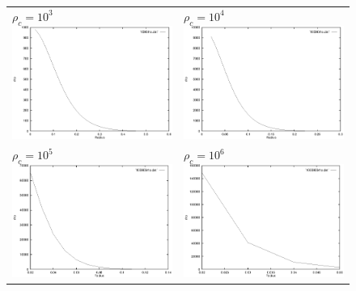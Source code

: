 \documentclass[a4paper]{IEEEtran}
\begin{document}
\begin{figure}
\begin{center}
\begin{tabular}{p{7cm}p{7cm}}
        \\
        $\rho_c = 10^3$ \newline \includegraphics[width=7cm]{figures/1000rho.eps}  & 
        $\rho_c = 10^4$ \newline \includegraphics[width=7cm]{figures/10000rho.eps}   
        \\
        $\rho_c = 10^5$ \newline \includegraphics[width=7cm]{figures/100000rho.eps}  & 
        $\rho_c = 10^6$ \newline \includegraphics[width=7cm]{figures/1000000rho.eps}
        \\ 
    \end{tabular}
    \end{center}
    \end{figure} 
\end{document}
